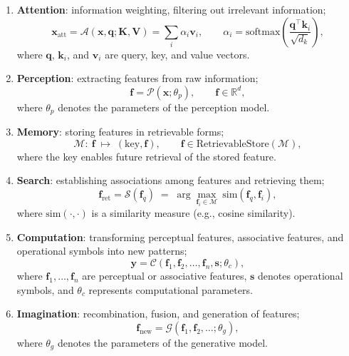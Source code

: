 \documentclass[12pt,a4paper]{article}
\newcommand{\Attn}{\mathcal{A}}
\newcommand{\Per}{\mathcal{P}}
\newcommand{\Mem}{\mathcal{M}}
\newcommand{\Srch}{\mathcal{S}}
\newcommand{\Comp}{\mathcal{C}}
\newcommand{\Imag}{\mathcal{G}}
\begin{document}
\begin{enumerate}
\item \textbf{Attention}: information weighting, filtering out irrelevant information;
\begin{equation}
\mathbf{x}_{\mathrm{att}}=\Attn(\mathbf{x},\mathbf{q};\mathbf{K},\mathbf{V})=\sum_i\alpha_i\mathbf{v}_i,\qquad
\alpha_i=\mathrm{softmax}\left(\frac{\mathbf{q}^{\top}\mathbf{k}_i}{\sqrt{d_k}}\right),
\label{eq:attention}
\end{equation}
where $\mathbf{q}$, $\mathbf{k}_i$, and $\mathbf{v}_i$ are query, key, and value vectors.

\item \textbf{Perception}: extracting features from raw information;
\begin{equation}
\mathbf{f}=\Per(\mathbf{x};\theta_p),\qquad \mathbf{f}\in\mathbb{R}^{d},
\label{eq:perception}
\end{equation}
where $\theta_p$ denotes the parameters of the perception model.

\item \textbf{Memory}: storing features in retrievable forms;
\begin{equation}
\Mem:\ \mathbf{f}\;\mapsto\;(\mathrm{key},\mathbf{f}),\qquad
\mathbf{f}\in \mathrm{RetrievableStore}(\Mem),
\label{eq:memory}
\end{equation}
where the key enables future retrieval of the stored feature.

\item \textbf{Search}: establishing associations among features and retrieving them;
\begin{equation}
\mathbf{f}_{\mathrm{ret}}=\Srch(\mathbf{f}_q)\;=\;\arg\max_{\mathbf{f}_i\in\Mem}\ \mathrm{sim}(\mathbf{f}_q,\mathbf{f}_i),
\label{eq:search}
\end{equation}
where $\mathrm{sim}(\cdot,\cdot)$ is a similarity measure (e.g., cosine similarity).

\item \textbf{Computation}: transforming perceptual features, associative features, and operational symbols into new patterns;
\begin{equation}
\mathbf{y}=\Comp(\mathbf{f}_1,\mathbf{f}_2,\dots,\mathbf{f}_n,\mathbf{s};\theta_c),
\label{eq:computation}
\end{equation}
where $\mathbf{f}_1,\dots,\mathbf{f}_n$ are perceptual or associative features, $\mathbf{s}$ denotes operational symbols, and $\theta_c$ represents computational parameters.

\item \textbf{Imagination}: recombination, fusion, and generation of features;
\begin{equation}
\mathbf{f}_{\mathrm{new}}=\Imag(\mathbf{f}_1,\mathbf{f}_2,\dots;\theta_g),
\label{eq:imagination}
\end{equation}
where $\theta_g$ denotes the parameters of the generative model.
\end{enumerate}
\end{document}
